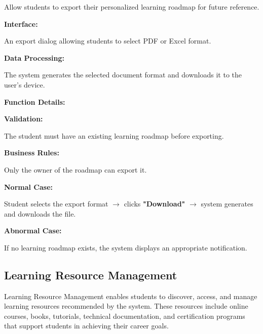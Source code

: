 Allow students to export their personalized learning roadmap for future reference.

\vspace{0.2cm}

\textbf{Interface:}

An export dialog allowing students to select PDF or Excel format.

\vspace{0.2cm}

\textbf{Data Processing:}

The system generates the selected document format and downloads it to the user's device.

\vspace{0.3cm}

\textbf{Function Details:}

\textbf{Validation:}

The student must have an existing learning roadmap before exporting.

\textbf{Business Rules:}

Only the owner of the roadmap can export it.

\textbf{Normal Case:}

Student selects the export format $\rightarrow$ clicks \textbf{"Download"} $\rightarrow$ system generates and downloads the file.

\textbf{Abnormal Case:}

If no learning roadmap exists, the system displays an appropriate notification.

%

\subsection{Learning Resource Management}

Learning Resource Management enables students to discover, access, and manage learning resources recommended by the system. These resources include online courses, books, tutorials, technical documentation, and certification programs that support students in achieving their career goals.

